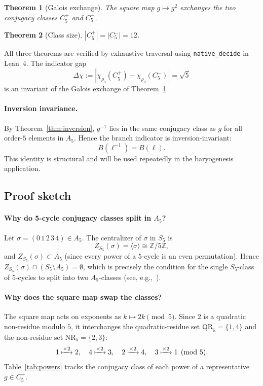 \documentclass[sn-mathphys-num,Numbered]{sn-jnl}
\theoremstyle{thmstyleone}
\newtheorem{theorem}{Theorem}[section]
\theoremstyle{thmstylethree}
\theoremstyle{thmstyletwo}
\begin{document}
\begin{theorem}[Galois exchange]
\label{thm:galois-exchange}
The square map $g \mapsto g^2$ exchanges the two conjugacy classes
$C_5^+$ and $C_5^-$.
\end{theorem}

\begin{theorem}[Class size]
\label{thm:class-size}
$|C_5^+| = |C_5^-| = 12$.
\end{theorem}

All three theorems are verified by exhaustive traversal using
\texttt{native\_decide} in Lean~4. The indicator gap
\begin{equation}
  \Delta\chi := |\chi_{\rho_3}(C_5^+) - \chi_{\rho_3}(C_5^-)| = \sqrt{5}
  \label{eq:deltachi}
\end{equation}
is an invariant of the Galois exchange of
Theorem~\ref{thm:galois-exchange}.

\paragraph{Inversion invariance.}
By Theorem~\ref{thm:inversion}, $g^{-1}$ lies in the same conjugacy class
as $g$ for all order-$5$ elements in $A_5$. Hence the branch indicator is
inversion-invariant:
\[
B(\ell^{-1}) = B(\ell).
\]
This identity is structural and will be used repeatedly in the
baryogenesis application.

\subsection{Proof sketch}
\label{ssec:claim1-proof}

\paragraph{Why do 5-cycle conjugacy classes split in $A_5$?}
Let $\sigma = (0\,1\,2\,3\,4) \in A_5$.  The centralizer of $\sigma$
in $S_5$ is
\[
  Z_{S_5}(\sigma) = \langle\sigma\rangle \cong \mathbb{Z}/5\mathbb{Z},
\]
and $Z_{S_5}(\sigma) \subset A_5$ (since every power of a $5$-cycle is
an even permutation).  Hence $Z_{S_5}(\sigma) \cap (S_5\setminus A_5)
= \emptyset$, which is precisely the condition for the single $S_5$-class
of $5$-cycles to split into two $A_5$-classes
(see, e.g.,~\cite{Isaacs1994}).

\paragraph{Why does the square map swap the classes?}
The square map acts on exponents as $k \mapsto 2k \pmod{5}$.  Since
$2$ is a quadratic non-residue modulo $5$, it interchanges the
quadratic-residue set $\mathrm{QR}_5 = \{1,4\}$ and the
non-residue set $\mathrm{NR}_5 = \{2,3\}$:
\[
  1 \xmapsto{\times 2} 2, \quad
  4 \xmapsto{\times 2} 3, \quad
  2 \xmapsto{\times 2} 4, \quad
  3 \xmapsto{\times 2} 1 \pmod{5}.
\]
Table~\ref{tab:powers} tracks the conjugacy class of each power of a
representative $g \in C_5^+$.
\end{document}
